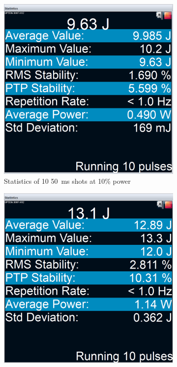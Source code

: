             \begin{figure}[h]
                \centering
                \begin{subfigure}[t]{0.45\textwidth}
                    \centering
                    \includegraphics[width=\textwidth]{assets/5 results/10p 50ms Statistics.png}
                    \caption{Statistics of 10 \qty{50}{ms} shots at 10\% power}
                \end{subfigure}
                \hfill
                \begin{subfigure}[t]{0.45\textwidth}
                    \centering
                    \includegraphics[width=\textwidth]{assets/5 results/12p 50ms Statistics.png}

\end{subfigure}
\end{figure}
